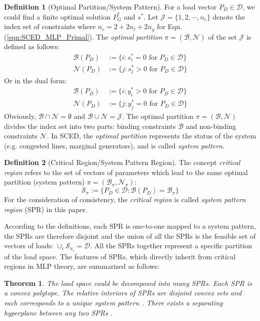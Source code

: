 \documentclass[letterpaper, 11pt]{article}
\theoremstyle{plain}
\newtheorem{thm}{Theorem}
\theoremstyle{definition}
\newtheorem{defn}{Definition}
\begin{document}
\begin{defn}[Optimal Partition/System Pattern]
\label{defn:optimal_partition}
For a load vector $P_D \in \mathcal{D}$, we could find a finite optimal solution $P_G^*$ and $s^*$. Let $\mathcal{J} = \{1,2,\cdots, n_c\}$ denote the index set of constraints where $n_c = 2+2n_l+2n_g$ for Eqn. (\ref{eqn:SCED_MLP_Primal}). The \emph{optimal partition} $\pi = (\mathcal{B},\mathcal{N})$ of the set $\mathcal{J}$ is defined as follows:
\begin{subequations}
\begin{align}
  \mathcal{B}(P_D) &:= \{i: s_i^* = 0 \text{ for } P_D \in \mathcal{D}  \} \\
  \mathcal{N}(P_D) &:= \{j: s_j^* > 0 \text{ for } P_D \in \mathcal{D} \} 
\end{align}
\end{subequations}
Or in the dual form:
\begin{subequations}
\begin{align}
  \mathcal{B}(P_D) &:= \{i: y_i^* > 0 \text{ for } P_D \in \mathcal{D}  \} \\
  \mathcal{N}(P_D) &:= \{j: y_j^* = 0 \text{ for } P_D \in \mathcal{D} \} 
\end{align}
\end{subequations}
Obviously, $\mathcal{B}\cap \mathcal{N} = \emptyset$ and $\mathcal{B}\cup \mathcal{N} = \mathcal{J}$. The optimal partition $\pi = (\mathcal{B}, \mathcal{N})$ divides the index set into two parts: binding constraints $\mathcal{B}$ and non-binding constraints $\mathcal{N}$.
In SCED, the \emph{optimal partition} represents the status of the system (e.g. congested lines, marginal generators), and is called \emph{system pattern}.
\end{defn}

\begin{defn}[Critical Region/System Pattern Region]
The concept \emph{critical region} refers to the set of vectors of parameters which lead to the same optimal partition (system pattern) $\pi = (\mathcal{B}_{\pi}, \mathcal{N}_{\pi})$:
\begin{equation}
\mathcal{S}_{\pi} := \{P_D \in \mathcal{D}: \mathcal{B}(P_D) = \mathcal{B}_{\pi}\}
\end{equation}
For the consideration of consistency, the \emph{critical region} is called \emph{system pattern region} (SPR) in this paper.
\end{defn}
According to the definitions, each SPR is one-to-one mapped to a system pattern, the SPRs are therefore disjoint and the union of all the SPRs is the feasible set of vectors of loads: $\cup_i \mathcal{S}_{\pi_i} = \mathcal{D}$.
All the SPRs together represent a specific partition of the load space. The features of SPRs, which directly inherit from critical regions in MLP theory, are summarized as follows:
\begin{thm}
\label{thm:convexSPR}
The load space could be decomposed into many SPRs. Each SPR is a convex polytope. The relative interiors of SPRs are disjoint convex sets and each corresponds to a unique system pattern \cite{Zhou2011}. 
There exists a separating hyperplane between any two SPRs \cite{Geng2015}.
\end{thm}
\end{document}
